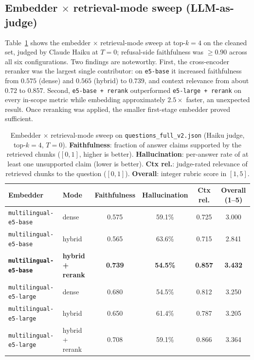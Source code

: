 \documentclass[fleqn,moreauthors,10pt]{ds_report}
\begin{document}
\subsection*{Embedder $\times$ retrieval-mode sweep (LLM-as-judge)}
Table~\ref{tab:embedder_matrix} shows the embedder $\times$ retrieval-mode sweep at top-$k{=}4$ on the cleaned set, judged by Claude Haiku at $T{=}0$; refusal-side faithfulness was $\geq 0.90$ across all six configurations. Two findings are noteworthy. First, the cross-encoder reranker was the largest single contributor: on \texttt{e5-base} it increased faithfulness from $0.575$ (dense) and $0.565$ (hybrid) to $0.739$, and context relevance from about $0.72$ to $0.857$. Second, \texttt{e5-base + rerank} outperformed \texttt{e5-large + rerank} on every in-scope metric while embedding approximately $2.5\times$ faster, an unexpected result. Once reranking was applied, the smaller first-stage embedder proved sufficient.

\begin{table}[hbt]
	\caption{Embedder $\times$ retrieval-mode sweep on \texttt{questions\_full\_v2.json} (Haiku judge, top-$k{=}4$, $T{=}0$). \textbf{Faithfulness}: fraction of answer claims supported by the retrieved chunks ($[0,1]$, higher is better). \textbf{Hallucination}: per-answer rate of at least one unsupported claim (lower is better). \textbf{Ctx rel.}: judge-rated relevance of retrieved chunks to the question ($[0,1]$). \textbf{Overall}: integer rubric score in $[1,5]$.}
	\centering
	\begin{tabular}{l|l|c|c|c|c}
		\toprule
		\textbf{Embedder} & \textbf{Mode} & \textbf{Faithfulness} & \textbf{Hallucination} & \textbf{Ctx rel.} & \textbf{Overall (1--5)} \\
		\midrule
		\texttt{multilingual-e5-base} & dense & 0.575 & 59.1\% & 0.725 & 3.000 \\
		\texttt{multilingual-e5-base} & hybrid & 0.565 & 63.6\% & 0.715 & 2.841 \\
		\textbf{\texttt{multilingual-e5-base}} & \textbf{hybrid + rerank} & \textbf{0.739} & \textbf{54.5\%} & \textbf{0.857} & \textbf{3.432} \\
		\texttt{multilingual-e5-large} & dense & 0.680 & 54.5\% & 0.812 & 3.250 \\
		\texttt{multilingual-e5-large} & hybrid & 0.650 & 61.4\% & 0.787 & 3.205 \\
		\texttt{multilingual-e5-large} & hybrid + rerank & 0.708 & 59.1\% & 0.866 & 3.364 \\
		\bottomrule
	\end{tabular}
	\label{tab:embedder_matrix}
\end{table}
\end{document}
